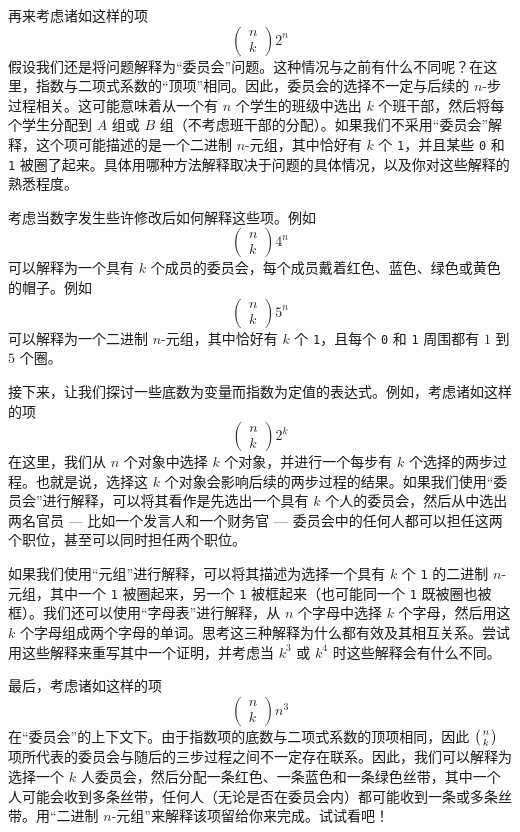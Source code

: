 再来考虑诸如这样的项
\[\begin{pmatrix}n\\k\end{pmatrix}2^n\]
假设我们还是将问题解释为``委员会''问题。这种情况与之前有什么不同呢？在这里，指数与二项式系数的``顶项''相同。因此，委员会的选择不一定与后续的 $n$-步过程相关。这可能意味着从一个有 $n$ 个学生的班级中选出 $k$ 个班干部，然后将每个学生分配到 $A$ 组或 $B$ 组（不考虑班干部的分配）。如果我们不采用``委员会''解释，这个项可能描述的是一个二进制 $n$-元组，其中恰好有 $k$ 个 \verb|1|，并且某些 \verb|0| 和 \verb|1| 被圈了起来。具体用哪种方法解释取决于问题的具体情况，以及你对这些解释的熟悉程度。

考虑当数字发生些许修改后如何解释这些项。例如
\[\begin{pmatrix}n\\k\end{pmatrix}4^n\]
可以解释为一个具有 $k$ 个成员的委员会，每个成员戴着红色、蓝色、绿色或黄色的帽子。例如
\[\begin{pmatrix}n\\k\end{pmatrix}5^n\]
可以解释为一个二进制 $n$-元组，其中恰好有 $k$ 个 \verb|1|，且每个 \verb|0| 和 \verb|1| 周围都有 $1$ 到 $5$ 个圈。

接下来，让我们探讨一些底数为变量而指数为定值的表达式。例如，考虑诸如这样的项
\[\begin{pmatrix}n\\k\end{pmatrix}2^k\]
在这里，我们从 $n$ 个对象中选择 $k$ 个对象，并进行一个每步有 $k$ 个选择的两步过程。也就是说，选择这 $k$ 个对象会影响后续的两步过程的结果。如果我们使用``委员会''进行解释，可以将其看作是先选出一个具有 $k$ 个人的委员会，然后从中选出两名官员 --- 比如一个发言人和一个财务官 --- 委员会中的任何人都可以担任这两个职位，甚至可以同时担任两个职位。

如果我们使用``元组''进行解释，可以将其描述为选择一个具有 $k$ 个 \verb|1| 的二进制 $n$-元组，其中一个 \verb|1| 被圈起来，另一个 \verb|1| 被框起来（也可能同一个 \verb|1| 既被圈也被框）。我们还可以使用``字母表''进行解释，从 $n$ 个字母中选择 $k$ 个字母，然后用这 $k$ 个字母组成两个字母的单词。思考这三种解释为什么都有效及其相互关系。尝试用这些解释来重写其中一个证明，并考虑当 $k^3$ 或 $k^4$ 时这些解释会有什么不同。

最后，考虑诸如这样的项
\[\begin{pmatrix}n\\k\end{pmatrix}n^3\]
在``委员会''的上下文下。由于指数项的底数与二项式系数的顶项相同，因此 $\big({n \atop k}\big)$ 项所代表的委员会与随后的三步过程之间不一定存在联系。因此，我们可以解释为选择一个 $k$ 人委员会，然后分配一条红色、一条蓝色和一条绿色丝带，其中一个人可能会收到多条丝带，任何人（无论是否在委员会内）都可能收到一条或多条丝带。用``二进制 $n$-元组''来解释该项留给你来完成。试试看吧！

